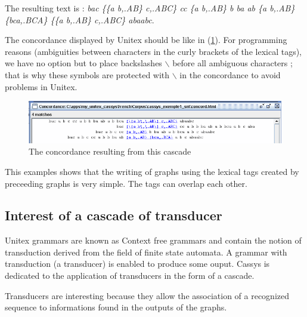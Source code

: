\bigskip
\noindent The resulting text is : \emph{bac \{\{a b,.AB\} c,.ABC\} cc \{a b,.AB\} b ba ab \{a b,.AB\} \{bca,.BCA\} \{\{a b,.AB\} c,.ABC\} abaabc}.


\bigskip
\noindent The concordance displayed by Unitex should be like in (\ref{fig13-07}). For programming reasons (ambiguities between characters in the curly brackets of the lexical tags), we have no option but to place backslashes $\backslash$ before all ambiguous characters ; that is why these symbols are protected with $\backslash$ in the concordance to avoid problems in Unitex. 

\begin{figure}[!htb]
  \centering
  \includegraphics[width=15cm]{resources/img/fig13-07.png}
  \caption{The concordance resulting from this cascade}
  \label{fig13-07}
\end{figure}

\bigskip
\noindent This examples shows that the writing of graphs using the lexical tags created by preceeding graphs is very simple. The tags can overlap each other.

\subsection{Interest of a cascade of transducer}

Unitex grammars are known as Context free grammars and contain the notion of transduction derived from the field 
of finite state automata. A grammar with transduction (a transducer) is enabled to produce some ouput. 
Cassys is dedicated to the application of transducers in the form of a cascade.

\bigskip
\noindent Transducers are interesting because they allow the association of a recognized sequence to informations found in the outputs of the graphs. 

